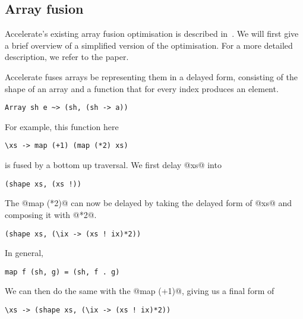 



\subsection{Array fusion}

Accelerate's existing array fusion optimisation is described in~\cite{McDonell:acc-optim}. We will first give a brief overview of a simplified version of the optimisation. For a more detailed description, we refer to the paper.

Accelerate fuses arrays be representing them in a delayed form, consisting of the shape of an array and a function that for every index produces an element.
%
\begin{lstlisting}
Array sh e ~> (sh, (sh -> a))
\end{lstlisting}

For example, this function here
%
\begin{lstlisting}
\xs -> map (+1) (map (*2) xs)
\end{lstlisting}
%
is fused by a bottom up traversal. We first delay @xs@ into
%
\begin{lstlisting}
(shape xs, (xs !))
\end{lstlisting}
%
The @map (*2)@ can now be delayed by taking the delayed form of @xs@ and composing it with @*2@.
%
\begin{lstlisting}
(shape xs, (\ix -> (xs ! ix)*2))
\end{lstlisting}
%
In general,
%
\begin{lstlisting}
map f (sh, g) = (sh, f . g)
\end{lstlisting}
%
We can then do the same with the @map (+1)@, giving us a final form of
%
\begin{lstlisting}
\xs -> (shape xs, (\ix -> (xs ! ix)*2))
\end{lstlisting}

